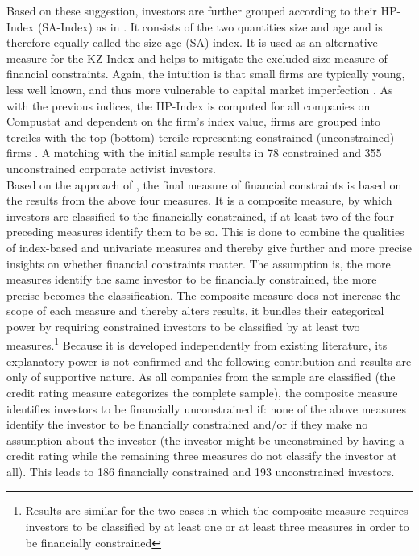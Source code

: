 \documentclass[12pt]{article}
\begin{document}
Based on these suggestion, investors are further grouped according to their HP-Index (SA-Index) as in \citet[p.1929]{hadlock2010}. It consists of the two quantities size and age and is therefore equally called the size-age (SA) index. It is used as an alternative measure for the KZ-Index and helps to mitigate the excluded size measure of financial constraints. Again, the intuition is that small firms are typically young, less well known, and thus more vulnerable to capital market imperfection \citep[p.1790]{Almeida2004}. As with the previous indices, the HP-Index is computed for all companies on Compustat and dependent on the firm's index value, firms are grouped into terciles with the top (bottom) tercile representing constrained (unconstrained) firms \citep[p.29]{Farre-mensa2013}. A matching with the initial sample results in 78 constrained and 355 unconstrained corporate activist investors.\\
Based on the approach of \citet[p.1188]{Campello2006}, the final measure of financial constraints is based on the results from the above four measures. It is a composite measure, by which investors are classified to the financially constrained, if at least two of the four preceding measures identify them to be so. This is done to combine the qualities of index-based and univariate measures and thereby give further and more precise insights on whether financial constraints matter. The assumption is, the more measures identify the same investor to be financially constrained, the more precise becomes the classification. The composite measure does not increase the scope of each measure and thereby alters results, it bundles their categorical power by requiring constrained investors to be classified by at least two measures.\footnote{Results are similar for the two cases in which the composite measure requires investors to be classified by at least one or at least three measures in order to be financially constrained} Because it is developed independently from existing literature, its explanatory power is not confirmed and the following contribution and results are only of supportive nature.
As all companies from the sample are classified (the credit rating measure categorizes the complete sample), the composite measure identifies investors to be financially unconstrained if: none of the above measures identify the investor to be financially constrained and/or if they make no assumption about the investor (the investor might be unconstrained by having a credit rating while the remaining three measures do not classify the investor at all). This leads to 186 financially constrained and 193 unconstrained investors. 
\end{document}
